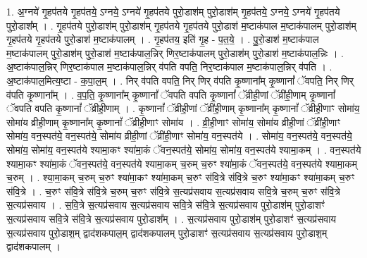 \documentclass[17pt]{extarticle}
\begin{document}
1. अ॒ग्नये॑ गृ॒हप॑तये गृ॒हप॑तये॒ ऽग्नये॒ ऽग्नये॑ गृ॒हप॑तये पुरो॒डाश॑म् पुरो॒डाश॑म् गृ॒हप॑तये॒ ऽग्नये॒ ऽग्नये॑ गृ॒हप॑तये पुरो॒डाश᳚म् । . गृ॒हप॑तये पुरो॒डाश॑म् पुरो॒डाश॑म् गृ॒हप॑तये गृ॒हप॑तये पुरो॒डाश॑ म॒ष्टाक॑पाल म॒ष्टाक॑पालम् पुरो॒डाश॑म् गृ॒हप॑तये गृ॒हप॑तये पुरो॒डाश॑ म॒ष्टाक॑पालम् । . गृ॒हप॑तय॒ इति॑ गृ॒ह - प॒त॒ये॒ । . पु॒रो॒डाश॑ म॒ष्टाक॑पाल म॒ष्टाक॑पालम् पुरो॒डाश॑म् पुरो॒डाश॑ म॒ष्टाक॑पाल॒न्निर् णिर॒ष्टाक॑पालम् पुरो॒डाश॑म् पुरो॒डाश॑ म॒ष्टाक॑पाल॒न्निः । . अ॒ष्टाक॑पाल॒न्निर् णिर॒ष्टाक॑पाल म॒ष्टाक॑पाल॒न्निर् व॑पति वपति॒ निर॒ष्टाक॑पाल म॒ष्टाक॑पाल॒न्निर् व॑पति । . अ॒ष्टाक॑पाल॒मित्य॒ष्टा - क॒पा॒ल॒म् । . निर् व॑पति वपति॒ निर् णिर् व॑पति कृ॒ष्णाना᳚म् कृ॒ष्णानां᳚ ॅवपति॒ निर् णिर् व॑पति कृ॒ष्णाना᳚म् । . व॒प॒ति॒ कृ॒ष्णाना᳚म् कृ॒ष्णानां᳚ ॅवपति वपति कृ॒ष्णानां᳚ ॅव्रीही॒णां ॅव्री॑ही॒णाम् कृ॒ष्णानां᳚ ॅवपति वपति कृ॒ष्णानां᳚ ॅव्रीही॒णाम् । . कृ॒ष्णानां᳚ ॅव्रीही॒णां ॅव्री॑ही॒णाम् कृ॒ष्णाना᳚म् कृ॒ष्णानां᳚ ॅव्रीही॒णाꣳ सोमा॑य॒ सोमा॑य व्रीही॒णाम् कृ॒ष्णाना᳚म् कृ॒ष्णानां᳚ ॅव्रीही॒णाꣳ सोमा॑य । . व्री॒ही॒णाꣳ सोमा॑य॒ सोमा॑य व्रीही॒णां ॅव्री॑ही॒णाꣳ सोमा॑य॒ वन॒स्पत॑ये॒ वन॒स्पत॑ये॒ सोमा॑य व्रीही॒णां ॅव्री॑ही॒णाꣳ सोमा॑य॒ वन॒स्पत॑ये । . सोमा॑य॒ वन॒स्पत॑ये॒ वन॒स्पत॑ये॒ सोमा॑य॒ सोमा॑य॒ वन॒स्पत॑ये श्यामा॒कꣳ श्या॑मा॒कं ॅवन॒स्पत॑ये॒ सोमा॑य॒ सोमा॑य॒ वन॒स्पत॑ये श्यामा॒कम् । . वन॒स्पत॑ये श्यामा॒कꣳ श्या॑मा॒कं ॅवन॒स्पत॑ये॒ वन॒स्पत॑ये श्यामा॒कम् च॒रुम् च॒रुꣳ श्या॑मा॒कं ॅवन॒स्पत॑ये॒ वन॒स्पत॑ये श्यामा॒कम् च॒रुम् । . श्या॒मा॒कम् च॒रुम् च॒रुꣳ श्या॑मा॒कꣳ श्या॑मा॒कम् च॒रुꣳ स॑वि॒त्रे स॑वि॒त्रे च॒रुꣳ श्या॑मा॒कꣳ श्या॑मा॒कम् च॒रुꣳ स॑वि॒त्रे । . च॒रुꣳ स॑वि॒त्रे स॑वि॒त्रे च॒रुम् च॒रुꣳ स॑वि॒त्रे स॒त्यप्र॑सवाय स॒त्यप्र॑सवाय सवि॒त्रे च॒रुम् च॒रुꣳ स॑वि॒त्रे स॒त्यप्र॑सवाय । . स॒वि॒त्रे स॒त्यप्र॑सवाय स॒त्यप्र॑सवाय सवि॒त्रे स॑वि॒त्रे स॒त्यप्र॑सवाय पुरो॒डाश॑म् पुरो॒डाशꣳ॑ स॒त्यप्र॑सवाय सवि॒त्रे स॑वि॒त्रे स॒त्यप्र॑सवाय पुरो॒डाश᳚म् । . स॒त्यप्र॑सवाय पुरो॒डाश॑म् पुरो॒डाशꣳ॑ स॒त्यप्र॑सवाय स॒त्यप्र॑सवाय पुरो॒डाश॒म् द्वाद॑शकपाल॒म् द्वाद॑शकपालम् पुरो॒डाशꣳ॑ स॒त्यप्र॑सवाय स॒त्यप्र॑सवाय पुरो॒डाश॒म् द्वाद॑शकपालम् । \newline
\end{document}
